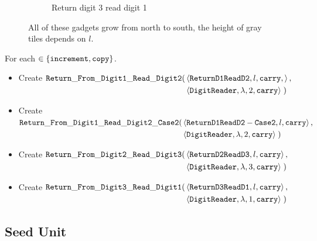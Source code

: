 \begin{figure}[H]
\begin{subfigure}[t]{0.2\textwidth}
                \caption{\label{fig:return_paths/return_digit1_read_digit2_general} Return digit 3 read digit 1}
            \end{subfigure}%
            \caption{\label{fig:return_path_same_row} All of these gadgets grow from north to south, the height of gray tiles depends on $l$.}
        \end{figure}

        \noindent For each {\inc} $\in \{ {\tt increment, copy } \}$.


        \begin{itemize}
            \item Create
            $\begin{aligned}[t]
                {\tt Return\_From\_Digit1\_Read\_Digit2}(& \left \langle {\tt ReturnD1ReadD2}, l, {\tt carry}, \right\rangle, \\
                                        & \left \langle {\tt DigitReader}, \lambda, 2, {\tt carry} \right\rangle \;)
            \end{aligned}$

            \item Create
            $\begin{aligned}[t]
                {\tt Return\_From\_Digit1\_Read\_Digit2\_Case2}(& \left \langle {\tt ReturnD1ReadD2-Case2}, l, {\tt carry} \right\rangle, \\
                                               & \left \langle {\tt DigitReader}, \lambda, 2, {\tt carry} \right\rangle \;)
            \end{aligned}$

            \item Create
            $\begin{aligned}[t]
                {\tt Return\_From\_Digit2\_Read\_Digit3}(& \left \langle {\tt ReturnD2ReadD3}, l, {\tt carry}  \right\rangle, \\
                                          & \left \langle {\tt DigitReader}, \lambda, 3, {\tt carry} \right\rangle \;)
            \end{aligned}$

            \item Create
            $\begin{aligned}[t]
                 {\tt Return\_From\_Digit3\_Read\_Digit1}(& \left \langle {\tt ReturnD3ReadD1}, l, {\tt carry} \right \rangle, \\
                                           & \left \langle {\tt DigitReader}, \lambda, 1, {\tt carry} \right \rangle \;)
            \end{aligned}$

        \end{itemize}

\subsection{Seed Unit}

